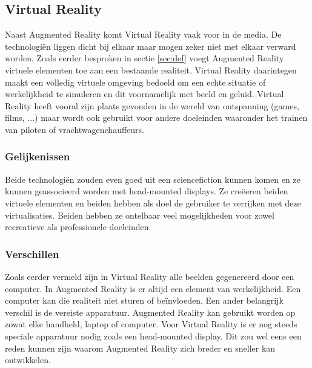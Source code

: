 \documentclass[pdftex,a4paper,12pt,twoside]{report}
\begin{document}
\subsection{Virtual Reality}
Naast Augmented Reality komt Virtual Reality vaak voor in de media.	De technologi\"en liggen dicht bij elkaar maar mogen zeker niet met elkaar verward worden. Zoals eerder besproken in sectie \ref{sec:def} voegt Augmented Reality virtuele elementen toe aan een bestaande realiteit. Virtual Reality daarintegen maakt een volledig virtuele omgeving bedoeld om een echte situatie of werkelijkheid te simuleren en dit voornamelijk met beeld en geluid. Virtual Reality heeft vooral zijn plaats gevonden in de wereld van ontspanning (games, films, ...) maar wordt ook gebruikt voor andere doeleinden waaronder het trainen van piloten of vrachtwagenchauffeurs.

\subsubsection{Gelijkenissen}
Beide technologi\"en zouden even goed uit een sciencefiction kunnen komen en ze kunnen geassocieerd worden met head-mounted displays. Ze cre\"eeren beiden virtuele elementen en beiden hebben als doel de gebruiker te verrijken met deze virtualisaties. Beiden hebben ze ontelbaar veel mogelijkheden voor zowel recreatieve als professionele doeleinden.

\subsubsection{Verschillen}
Zoals eerder vermeld zijn in Virtual Reality alle beelden gegenereerd door een computer. In Augmented Reality is er altijd een element van werkelijkheid. Een computer kan die realiteit niet sturen of be\"invloeden. Een ander belangrijk verschil is de vereiste apparatuur. Augmented Reality kan gebruikt worden op zowat elke handheld, laptop of computer. Voor Virtual Reality is er nog steeds speciale apparatuur nodig zoals een head-mounted display. Dit zou wel eens een reden kunnen zijn waarom Augmented Reality zich breder en sneller kan ontwikkelen.
  
\end{document}

